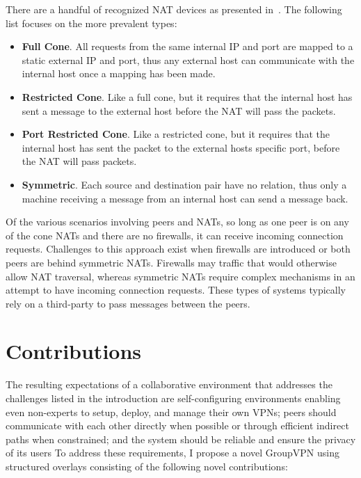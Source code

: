 There are a handful of recognized NAT devices as presented in~\cite{stun,
p2p_nats_rfc}.  The following list focuses on the more prevalent types:

\begin{itemize}

\item {\bf Full Cone}. All requests from the same internal IP and port are
mapped to a static external IP and port, thus any external host can communicate
with the internal host once a mapping has been made.

\item {\bf Restricted Cone}. Like a full cone, but it requires that the
internal host has sent a message to the external host before the NAT will pass
the packets.

\item {\bf Port Restricted Cone}. Like a restricted cone, but it requires that
the internal host has sent the packet to the external hosts specific port,
before the NAT will pass packets.

\item {\bf Symmetric}. Each source and destination pair have no relation, thus
only a machine receiving a message from an internal host can send a message
back.

\end{itemize}

Of the various scenarios involving peers and NATs, so long as one peer is on
any of the cone NATs and there are no firewalls, it can receive incoming
connection requests.  Challenges to this approach exist when firewalls are
introduced or both peers are behind symmetric NATs.  Firewalls may traffic that
would otherwise allow NAT traversal, whereas symmetric NATs require complex
mechanisms in an attempt to have incoming connection requests.  These types of
systems typically rely on a third-party to pass messages between the peers.

\section{Contributions}

The resulting expectations of a collaborative environment that addresses the
challenges listed in the introduction are self-configuring environments
enabling even non-experts to setup, deploy, and manage their own VPNs; peers
should communicate with each other directly when possible or through efficient
indirect paths when constrained; and the system should be reliable and ensure
the privacy of its users To address these requirements, I propose a novel
GroupVPN using structured overlays consisting of the following novel
contributions:

